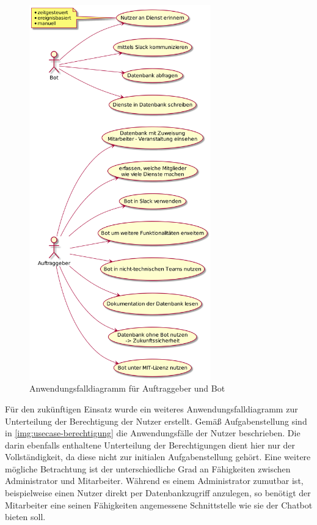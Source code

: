 \begin{figure}[htbp]
    \includegraphics[width=0.7\textwidth]{../docs/uml/usecase-stakeholder.png}
    \caption{Anwendungsfalldiagramm für Auftraggeber und Bot}
    \label{usecase-auftrag}
\end{figure}


Für den zukünftigen Einsatz wurde ein weiteres Anwendungsfalldiagramm zur Unterteilung der Berechtigung der Nutzer erstellt. Gemäß Aufgabenstellung sind in \autoref{img:usecase-berechtigung} die Anwendungsfälle der Nutzer beschrieben. Die darin ebenfalls enthaltene Unterteilung der Berechtigungen dient hier nur der Vollständigkeit, da diese nicht zur initialen Aufgabenstellung gehört.
Eine weitere mögliche Betrachtung ist der unterschiedliche Grad an Fähigkeiten zwischen Administrator und Mitarbeiter. Während es einem Administrator zumutbar ist, beispielweise einen Nutzer direkt per Datenbankzugriff anzulegen, so benötigt der Mitarbeiter eine seinen Fähigkeiten angemessene Schnittstelle wie sie der Chatbot bieten soll.

